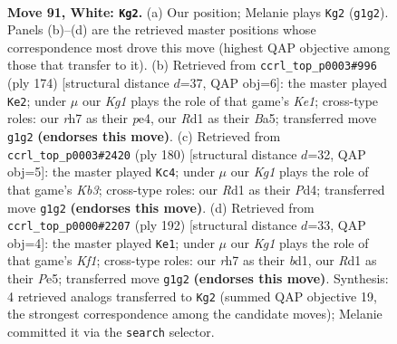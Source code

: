 \documentclass[11pt]{article}
\begin{document}
\clearpage

\begin{figure}[p]\centering
\begin{subfigure}{0.46\textwidth}\centering
\resizebox{\linewidth}{!}{%
\newchessgame
\chessboard[
  setfen={8/7r/p3k3/P1p2p1p/1pp2P1P/4P1P1/1P6/3R2K1 w - - 2 91},
  showmover=false,
  pgfstyle=straightmove, color=movearrow, markmove={g1-g2}
]}
\caption{}
\end{subfigure}\hfill
\begin{subfigure}{0.46\textwidth}\centering
\resizebox{\linewidth}{!}{%
\newchessgame
\chessboard[
  setfen={8/4k3/5p2/B2b1Pp1/3Pp1Pp/4P2P/8/4K3 w - - 60 88},
  showmover=false,
  pgfstyle=straightmove, color=movearrow, markmove={e1-e2}
]}
\caption{}
\end{subfigure}
\\[4pt]
\begin{subfigure}{0.46\textwidth}\centering
\resizebox{\linewidth}{!}{%
\newchessgame
\chessboard[
  setfen={8/8/1p2k3/1P3p1p/3Pp1pP/1K2P1P1/5P2/8 w - - 6 91},
  showmover=false,
  pgfstyle=straightmove, color=movearrow, markmove={b3-c4}
]}
\caption{}
\end{subfigure}\hfill
\begin{subfigure}{0.46\textwidth}\centering
\resizebox{\linewidth}{!}{%
\newchessgame
\chessboard[
  setfen={3B4/5p1p/4p3/2k1PpP1/p4P2/P5P1/8/3b1K2 w - - 74 97},
  showmover=false,
  pgfstyle=straightmove, color=movearrow, markmove={f1-e1}
]}
\caption{}
\end{subfigure}
\caption{\textbf{Move 91, White: \texttt{Kg2}.} (a) Our position; Melanie plays \texttt{Kg2} (\texttt{g1g2}). Panels (b)--(d) are the retrieved master positions whose correspondence most drove this move (highest QAP objective among those that transfer to it). (b) Retrieved from \texttt{ccrl\_top\_p0003\#996} (ply 174) [structural distance $d$=37, QAP obj=6]: the master played \texttt{Ke2}; under $\mu$ our \emph{Kg1} plays the role of that game's \emph{Ke1}; cross-type roles: our \emph{r}h7 as their \emph{p}e4, our \emph{R}d1 as their \emph{B}a5; transferred move \texttt{g1g2} \textbf{(endorses this move)}. (c) Retrieved from \texttt{ccrl\_top\_p0003\#2420} (ply 180) [structural distance $d$=32, QAP obj=5]: the master played \texttt{Kc4}; under $\mu$ our \emph{Kg1} plays the role of that game's \emph{Kb3}; cross-type roles: our \emph{R}d1 as their \emph{P}d4; transferred move \texttt{g1g2} \textbf{(endorses this move)}. (d) Retrieved from \texttt{ccrl\_top\_p0000\#2207} (ply 192) [structural distance $d$=33, QAP obj=4]: the master played \texttt{Ke1}; under $\mu$ our \emph{Kg1} plays the role of that game's \emph{Kf1}; cross-type roles: our \emph{r}h7 as their \emph{b}d1, our \emph{R}d1 as their \emph{P}e5; transferred move \texttt{g1g2} \textbf{(endorses this move)}. Synthesis: 4 retrieved analogs transferred to \texttt{Kg2} (summed QAP objective 19, the strongest correspondence among the candidate moves); Melanie committed it via the \texttt{search} selector.}
\label{fig:thought-m180}
\end{figure}
\end{document}
